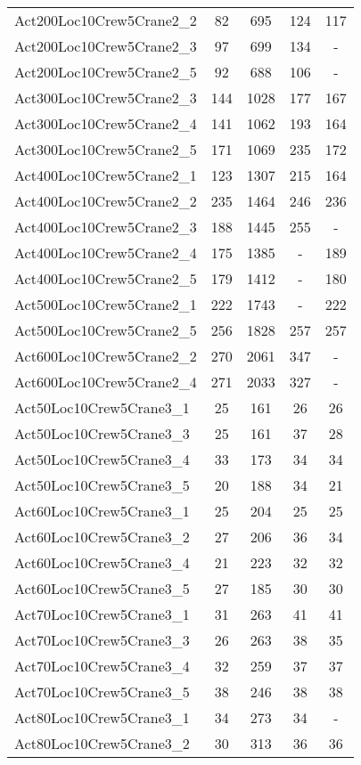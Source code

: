 \begin{center}
\begin{longtable}{ | l | c | c | c | c | }
Act200Loc10Crew5Crane2\_2	&	82	&	695	&	124	&	117	\\
Act200Loc10Crew5Crane2\_3	&	97	&	699	&	134	&	-	\\
Act200Loc10Crew5Crane2\_5	&	92	&	688	&	106	&	-	\\
Act300Loc10Crew5Crane2\_3	&	144	&	1028	&	177	&	167	\\
Act300Loc10Crew5Crane2\_4	&	141	&	1062	&	193	&	164	\\
Act300Loc10Crew5Crane2\_5	&	171	&	1069	&	235	&	172	\\
Act400Loc10Crew5Crane2\_1	&	123	&	1307	&	215	&	164	\\
Act400Loc10Crew5Crane2\_2	&	235	&	1464	&	246	&	236	\\
Act400Loc10Crew5Crane2\_3	&	188	&	1445	&	255	&	-	\\
Act400Loc10Crew5Crane2\_4	&	175	&	1385	&	-	&	189	\\
Act400Loc10Crew5Crane2\_5	&	179	&	1412	&	-	&	180	\\
Act500Loc10Crew5Crane2\_1	&	222	&	1743	&	-	&	222	\\
Act500Loc10Crew5Crane2\_5	&	256	&	1828	&	257	&	257	\\
Act600Loc10Crew5Crane2\_2	&	270	&	2061	&	347	&	-	\\
Act600Loc10Crew5Crane2\_4	&	271	&	2033	&	327	&	-	\\ \hline
Act50Loc10Crew5Crane3\_1	&	25	&	161	&	26	&	26	\\
Act50Loc10Crew5Crane3\_3	&	25	&	161	&	37	&	28	\\
Act50Loc10Crew5Crane3\_4	&	33	&	173	&	34	&	34	\\
Act50Loc10Crew5Crane3\_5	&	20	&	188	&	34	&	21	\\
Act60Loc10Crew5Crane3\_1	&	25	&	204	&	25	&	25	\\
Act60Loc10Crew5Crane3\_2	&	27	&	206	&	36	&	34	\\
Act60Loc10Crew5Crane3\_4	&	21	&	223	&	32	&	32	\\
Act60Loc10Crew5Crane3\_5	&	27	&	185	&	30	&	30	\\
Act70Loc10Crew5Crane3\_1	&	31	&	263	&	41	&	41	\\
Act70Loc10Crew5Crane3\_3	&	26	&	263	&	38	&	35	\\
Act70Loc10Crew5Crane3\_4	&	32	&	259	&	37	&	37	\\
Act70Loc10Crew5Crane3\_5	&	38	&	246	&	38	&	38	\\
Act80Loc10Crew5Crane3\_1	&	34	&	273	&	34	&	-	\\
Act80Loc10Crew5Crane3\_2	&	30	&	313	&	36	&	36	\\

\end{longtable}
\end{center}
